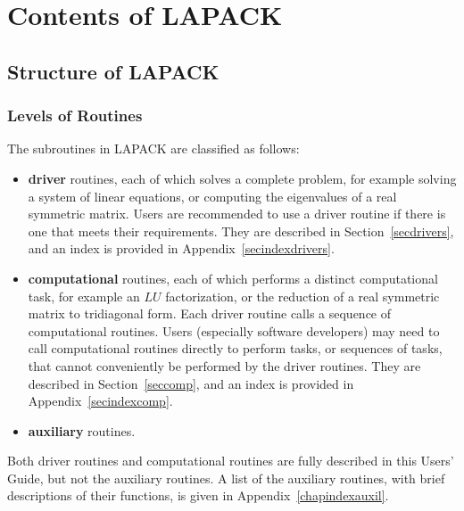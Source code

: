 \chapter{Contents of LAPACK}\label{chapcontents}

\section{Structure of LAPACK}\label{secstruct}

\subsection{Levels of Routines}\label{subseclevels}

The subroutines in LAPACK are classified as follows:

\begin{itemize}

\item {\bf driver} routines, each of which solves a complete problem,
for example solving a system of linear equations, or computing the
eigenvalues of a real symmetric matrix.
Users are recommended to use a driver routine if there is one that
meets their requirements. They are described in Section~\ref{secdrivers},
and an index is provided in Appendix~\ref{secindexdrivers}.

\item {\bf computational} routines, each of which performs a distinct
computational task, for example an $LU$ factorization,
or the reduction of a real symmetric matrix to tridiagonal form.
Each driver routine calls a
sequence of computational routines. Users (especially software developers)
may need to call
computational routines directly to perform tasks, or sequences of tasks,
that cannot conveniently
be performed by the driver routines. They are described in Section~\ref{seccomp},
and an index is provided in Appendix~\ref{secindexcomp}.

\item {\bf auxiliary} routines.

\end{itemize}

Both driver routines and computational routines are fully described in
this Users' Guide, but not the auxiliary routines.
A list of the auxiliary routines, with brief descriptions
of their functions, is given in Appendix~\ref{chapindexauxil}.

